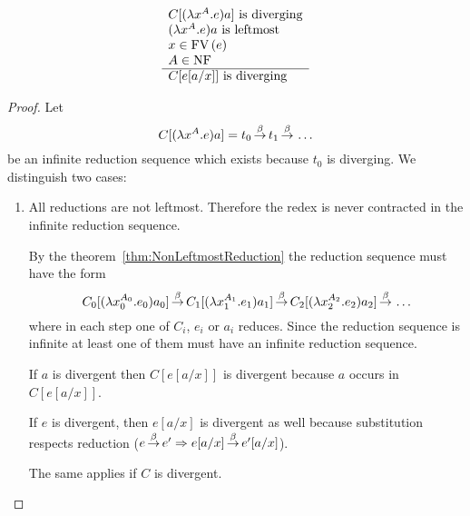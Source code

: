 {
    \def\redex#1#2#3#4{{(\lambda #1^{#2}. #3) #4}}




    \begin{theorem}
        \def\red{{\redex x A e a}}
        \def\redi#1{{\redex {x_{#1}} {A_{#1}} {e_{#1}} {a_{#1}}}}
        \def\contr{{e[a/x]}}

        $$
        \rulev{
            C[\red] \text{ is diverging}
            \\
            \red \text{ is leftmost}
            \\
            x \in \FV(e)
            \\
            A \in \NF
        }
        {
            C[\contr] \text{ is diverging}
        }
        $$
        \begin{proof}
            Let
            $$
            C[\red] = t_0 \reduce t_1 \reduce \ldots
            $$
            be an infinite reduction sequence which exists because $t_0$ is
            diverging. We distinguish two cases:
            \begin{enumerate}

            \item All reductions are not leftmost. Therefore the redex is never
                contracted in the infinite reduction sequence.

                By the theorem~\ref{thm:NonLeftmostReduction} the reduction
                sequence must have the form
                $$
                    C_0[\redi 0]
                    \reduce C_1[\redi 1]
                    \reduce C_2[\redi 2]
                    \reduce \ldots
                $$
                where in each step one of $C_i$, $e_i$ or $a_i$
                reduces. Since the reduction sequence is infinite at least one
                of them must have an infinite reduction sequence.

                If $a$ is divergent then $C[\contr]$ is divergent because $a$
                    occurs in $C[\contr]$.

                If $e$ is divergent, then $e[a/x]$ is divergent as well because
                    substitution respects reduction ($e {\,\stackrel{\beta}{\to}\,} e' \Rightarrow e[a/x]
                    {\,\stackrel{\beta}{\to}\,} e'[a/x]$).

                The same applies if $C$ is divergent.


\end{enumerate}
\end{proof}
\end{theorem}}
